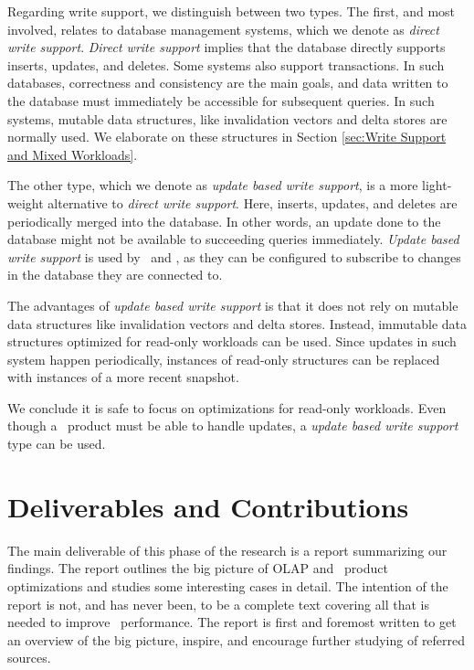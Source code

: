 Regarding write support, we distinguish between two types. The first, and most involved, relates to database management systems, which we denote as \textit{direct write support}. \textit{Direct write support} implies that the database directly supports inserts, updates, and deletes. Some systems also support transactions. In such databases, correctness and consistency are the main goals, and data written to the database must immediately be accessible for subsequent queries. In such systems, mutable data structures, like invalidation vectors and delta stores are normally used. We elaborate on these structures in Section \ref{sec:Write Support and Mixed Workloads}.


The other type, which we denote as \textit{update based write support}, is a more light-weight alternative to \textit{direct write support}. Here, inserts, updates, and deletes are periodically merged into the database. In other words, an update done to the database might not be available to succeeding queries immediately. \textit{Update based write support} is used by \qlikview~and \tableau, as they can be configured to subscribe to changes in the database they are connected to.

The advantages of \textit{update based write support} is that it does not rely on mutable data structures like invalidation vectors and delta stores. Instead, immutable data structures optimized for read-only workloads can be used. Since updates in such system happen periodically, instances of read-only structures can be replaced with instances of a more recent snapshot.

We conclude it is safe to focus on optimizations for read-only workloads. Even though a \bd~product must be able to handle updates, a \textit{update based write support} type can be used.



\section{Deliverables and Contributions}
\label{sec:Deliverables and Contributions}

The main deliverable of this phase of the research is a report summarizing our findings. The report outlines the big picture of OLAP and \bd~product optimizations and studies some interesting cases in detail. The intention of the report is not, and has never been, to be a complete text covering all that is needed to improve \bd~performance. The report is first and foremost written to get an overview of the big picture, inspire, and encourage further studying of referred sources. 

